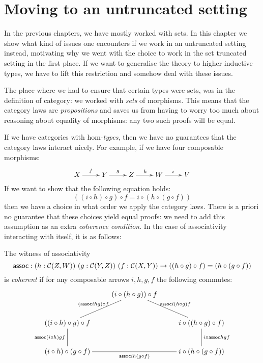 \chapter{Moving to an untruncated setting}
\label{untruncated}

In the previous chapters, we have mostly worked with sets. In this
chapter we show what kind of issues one encounters if we work in an
untruncated setting instead, motivating why we went with the choice to
work in the set truncated setting in the first place. If we want to
generalise the theory to higher inductive types, we have to lift this
restriction and somehow deal with these issues.

The place where we had to ensure that certain types were sets, was in
the definition of category: we worked with \emph{sets} of
morphisms. This means that the category laws are \emph{propositions}
and saves us from having to worry too much about reasoning about
equality of morphisms: any two such proofs will be equal.

If we have categories with hom-\emph{types}, then we have no
guarantees that the category laws interact nicely. For example, if we
have four composable morphisms:
$$
\xymatrix{
  X \ar[r]^{f} &Y \ar[r]^{g} &Z \ar[r]^{h} &W \ar[r]^{i} &V
}
$$
If we want to show that the following equation holds:
$$
((i \circ h) \circ g) \circ f = i \circ (h \circ (g \circ f))
$$
then we have a choice in what order we apply the category laws. There
is a priori no guarantee that these choices yield equal proofs: we
need to add this assumption as an extra \emph{coherence condition}. In
the case of associativity interacting with itself, it is as follows:

\begin{definition}
  The witness of associativity
  $$
  \assoc : (h : \Cc(Z,W))\ (g : \Cc(Y,Z))\ (f : \Cc(X,Y)) \to ((h \circ g) \circ f) = (h \circ (g \circ f))
  $$
  is \emph{coherent} if for any composable arrows $i, h, g, f$ the
  following commutes:
  $$
  \xymatrix{
    &(i \circ (h \circ g)) \circ f \ar@{-}[dr]^{\assoc i (h \circ g) f} &\\
    ((i \circ h) \circ g) \circ f \ar@{-}[ur]^{(\assoc i h g) \circ f} \ar@{-}[d]_{\assoc (i \circ h) g f}  &&i \circ ((h \circ g) \circ f) \ar@{-}[d]^{i \circ \assoc h g f}\\
    (i \circ h) \circ (g \circ f) \ar@{-}[rr]_{\assoc i h (g \circ f)} &&i \circ (h \circ (g \circ f))
  }
  $$
\end{definition}

